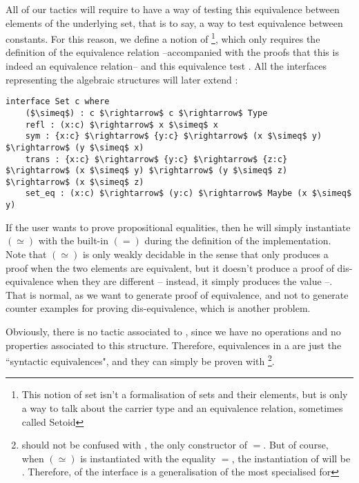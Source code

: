 All of our tactics will require to have a way of testing this equivalence between elements of the underlying set, that is to say, a way to test equivalence between constants. For this reason, we define a notion of \footnote{This notion of set isn't a formalisation of sets and their elements, but is only a way to talk about the carrier type and an equivalence relation, sometimes called Setoid}, which only requires the definition of the equivalence relation --accompanied with the proofs that this is indeed an equivalence relation-- and this equivalence test . All the interfaces representing the algebraic structures will later extend  :

\begin{lstlisting}
interface Set c where
    ($\simeq$) : c $\rightarrow$ c $\rightarrow$ Type
    refl : (x:c) $\rightarrow$ x $\simeq$ x
    sym : {x:c} $\rightarrow$ {y:c} $\rightarrow$ (x $\simeq$ y) $\rightarrow$ (y $\simeq$ x)
    trans : {x:c} $\rightarrow$ {y:c} $\rightarrow$ {z:c} $\rightarrow$ (x $\simeq$ y) $\rightarrow$ (y $\simeq$ z) $\rightarrow$ (x $\simeq$ z)    
    set_eq : (x:c) $\rightarrow$ (y:c) $\rightarrow$ Maybe (x $\simeq$ y)
\end{lstlisting}

If the user wants to prove propositional equalities, then he will simply instantiate $(\simeq)$ with the built-in $(=)$ during the definition of the  implementation.
Note that $(\simeq)$ is only weakly decidable in the sense that  only produces a proof when the two elements are equivalent, but it doesn't produce a proof of dis-equivalence when they are different -- instead, it simply produces the value --. That is normal, as we want to generate proof of equivalence, and not to generate counter examples for proving dis-equivalence, which is another problem.

Obviously, there is no tactic associated to , since we have no operations and no properties associated to this structure. Therefore, equivalences in a  are just the ``syntactic equivalences", and they can simply be proven with \footnote{ should not be confused with , the only constructor of $=$. But of course, when $(\simeq)$ is instantiated with the equality $=$, the instantiation of  will be . Therefore,  of the interface  is a generalisation of the most specialised  for \code{=}}.


